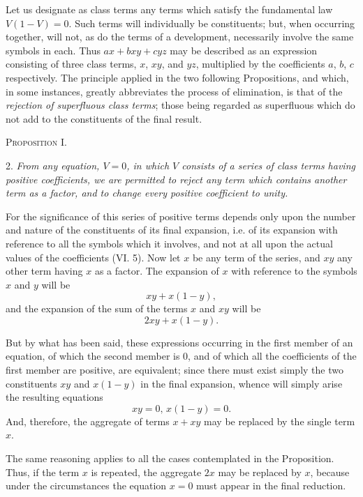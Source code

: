 \documentclass[oneside]{book}
\begin{document}
Let us designate as class terms any terms which satisfy the
fundamental law $V(1-V) = 0$. Such terms will individually
be constituents; but, when occurring together, will not, as do
the terms of a development, necessarily involve the same symbols
in each. Thus $ax+bxy+cyz$ may be described as an expression
consisting of three class terms, $x$, $xy$, and $yz$, multiplied by the
coefficients $a$, $b$, $c$ respectively. The principle applied in the two
following Propositions, and which, in some instances, greatly
abbreviates the process of elimination, is that of the \textit{rejection of
superfluous class terms}; those being regarded as superfluous
which do not add to the constituents of the final result.

\begin{center}
\textsc{Proposition I.}
\end{center}

2. \textit{From any equation, $V = 0$, in which $V$ consists of a series of
class terms having positive coefficients, we are permitted to reject any
term which contains another term as a factor, and to change every
positive coefficient to unity.}

For the significance of this series of positive terms depends
only upon the number and nature of the constituents of its final
expansion, i.e. of its expansion with reference to all the symbols
which it involves, and not at all upon the actual values of the
coefficients (VI. 5). Now let $x$ be any term of the series, and
$xy$ any other term having $x$ as a factor. The expansion of $x$ with
reference to the symbols $x$ and $y$ will be
\[
xy + x \left(1 - y\right),
\]
and the expansion of the sum of the terms $x$ and $xy$ will be
\[
2xy + x \left(1 - y\right).
\]

But by what has been said, these expressions occurring in the
first member of an equation, of which the second member is 0,
and of which all the coefficients of the first member are positive,
are equivalent; since there must exist simply the two constituents
$xy$ and $x \left(1-y\right)$ in the final expansion, whence will simply arise
the resulting equations
\[
xy = 0\textrm{, } x \left(1-y\right) = 0.
\]
And, therefore, the aggregate of terms $x + xy$ may be replaced by
the single term $x$.

The same reasoning applies to all the cases contemplated in
the Proposition. Thus, if the term $x$ is repeated, the aggregate
$2x$ may be replaced by $x$, because under the circumstances the
equation $x = 0$ must appear in the final reduction.
\end{document}
